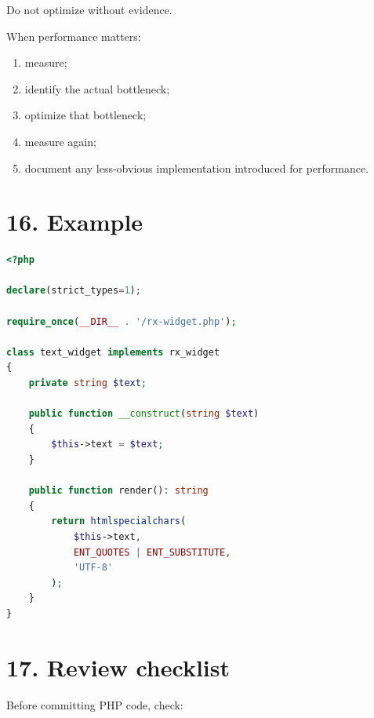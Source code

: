 \documentclass[11pt,a4paper]{article}
\begin{document}
Do not optimize without evidence.

When performance matters:

\begin{enumerate}
\def\labelenumi{\arabic{enumi}.}
\tightlist
\item
  measure;
\item
  identify the actual bottleneck;
\item
  optimize that bottleneck;
\item
  measure again;
\item
  document any less-obvious implementation introduced for performance.
\end{enumerate}

\section{16. Example}\label{16-example}

\begin{lstlisting}[language=PHP]
<?php

declare(strict_types=1);

require_once(__DIR__ . '/rx-widget.php');

class text_widget implements rx_widget
{
    private string $text;

    public function __construct(string $text)
    {
        $this->text = $text;
    }

    public function render(): string
    {
        return htmlspecialchars(
            $this->text,
            ENT_QUOTES | ENT_SUBSTITUTE,
            'UTF-8'
        );
    }
}
\end{lstlisting}

\section{17. Review checklist}\label{17-review-checklist}

Before committing PHP code, check:
\end{document}
